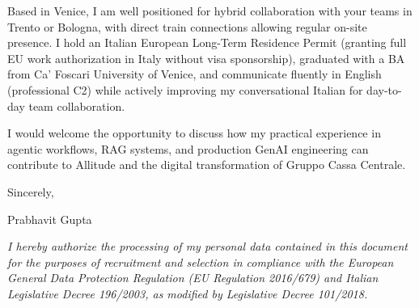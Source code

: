 \documentclass[10.5pt,a4paper]{article}
\begin{document}
Based in Venice, I am well positioned for hybrid collaboration with your teams in Trento or Bologna, with direct train connections allowing regular on-site presence. I hold an Italian European Long-Term Residence Permit (granting full EU work authorization in Italy without visa sponsorship), graduated with a BA from Ca' Foscari University of Venice, and communicate fluently in English (professional C2) while actively improving my conversational Italian for day-to-day team collaboration.

I would welcome the opportunity to discuss how my practical experience in agentic workflows, RAG systems, and production GenAI engineering can contribute to Allitude and the digital transformation of Gruppo Cassa Centrale.

Sincerely,

Prabhavit Gupta

\vspace{0.8em}
{\footnotesize \textit{I hereby authorize the processing of my personal data contained in this document for the purposes of recruitment and selection in compliance with the European General Data Protection Regulation (EU Regulation 2016/679) and Italian Legislative Decree 196/2003, as modified by Legislative Decree 101/2018.}\par}
\end{document}
